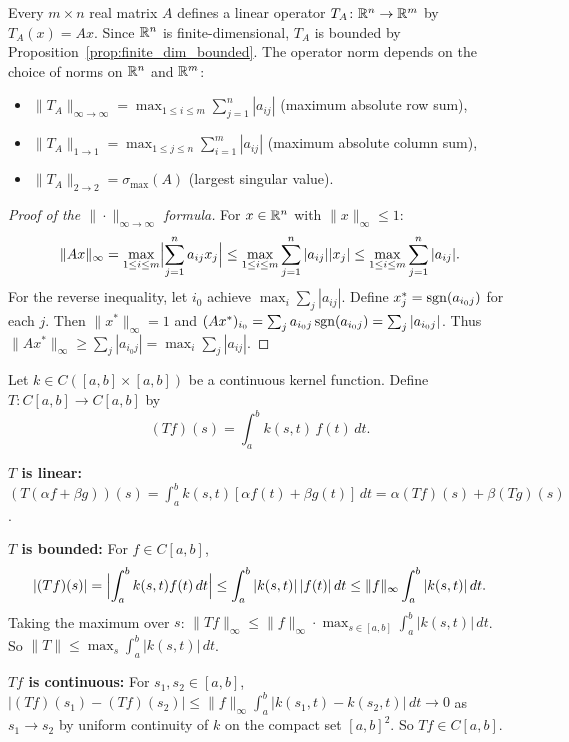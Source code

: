 \documentclass[11pt,a4paper]{article}
\begin{document}
\begin{example}
\label{ex:matrix_op}
Every $m \times n$ real matrix $A$ defines a linear operator
$T_A \colon \mathbb{R}^n \to \mathbb{R}^m$ by $T_A(x) = Ax$. Since $\mathbb{R}^n$ is
finite-dimensional, $T_A$ is bounded by
Proposition~\ref{prop:finite_dim_bounded}. The operator norm depends on the
choice of norms on $\mathbb{R}^n$ and $\mathbb{R}^m$:
\begin{itemize}[nosep]
  \item $\|T_A\|_{\infty \to \infty} = \max_{1 \le i \le m} \sum_{j=1}^n
    |a_{ij}|$ \hfill (maximum absolute row sum),
  \item $\|T_A\|_{1 \to 1} = \max_{1 \le j \le n} \sum_{i=1}^m |a_{ij}|$
    \hfill (maximum absolute column sum),
  \item $\|T_A\|_{2 \to 2} = \sigma_{\max}(A)$
    \hfill (largest singular value).
\end{itemize}
\end{example}

\begin{proof}[Proof of the $\|\cdot\|_{\infty \to \infty}$ formula]
For $x \in \mathbb{R}^n$ with $\|x\|_\infty \le 1$:
\[
\|Ax\|_\infty = \max_{1 \le i \le m} \Bigl|\sum_{j=1}^n a_{ij} x_j\Bigr|
\le \max_{1 \le i \le m} \sum_{j=1}^n |a_{ij}| |x_j|
\le \max_{1 \le i \le m} \sum_{j=1}^n |a_{ij}|.
\]
For the reverse inequality, let $i_0$ achieve $\max_i \sum_j |a_{ij}|$.
Define $x_j^* = \operatorname{sgn}(a_{i_0 j})$ for each $j$. Then $\|x^*\|_\infty = 1$
and
$(Ax^*)_{i_0} = \sum_j a_{i_0 j} \operatorname{sgn}(a_{i_0 j}) = \sum_j |a_{i_0 j}|$.
Thus $\|Ax^*\|_\infty \ge \sum_j |a_{i_0 j}| = \max_i \sum_j |a_{ij}|$.
\end{proof}

\begin{example}
\label{ex:integral_op}
Let $k \in C([a,b] \times [a,b])$ be a continuous kernel function. Define
$T \colon C[a,b] \to C[a,b]$ by
\[
(Tf)(s) = \int_a^b k(s,t)\, f(t)\, dt.
\]

\textbf{$T$ is linear:} $(T(\alpha f + \beta g))(s) = \int_a^b k(s,t)
[\alpha f(t) + \beta g(t)]\, dt = \alpha (Tf)(s) + \beta (Tg)(s)$.

\textbf{$T$ is bounded:} For $f \in C[a,b]$,
\[
|(Tf)(s)| = \Bigl|\int_a^b k(s,t) f(t)\, dt\Bigr|
\le \int_a^b |k(s,t)| \, |f(t)|\, dt
\le \|f\|_\infty \int_a^b |k(s,t)|\, dt.
\]
Taking the maximum over $s$:
$\|Tf\|_\infty \le \|f\|_\infty \cdot \max_{s \in [a,b]} \int_a^b
|k(s,t)|\, dt$. So $\|T\| \le \max_s \int_a^b |k(s,t)|\, dt$.

\textbf{$Tf$ is continuous:} For $s_1, s_2 \in [a,b]$,
$|(Tf)(s_1) - (Tf)(s_2)| \le \|f\|_\infty \int_a^b |k(s_1,t) - k(s_2,t)|\, dt
\to 0$ as $s_1 \to s_2$ by uniform continuity of $k$ on the compact set
$[a,b]^2$. So $Tf \in C[a,b]$.
\end{example}
\end{document}

